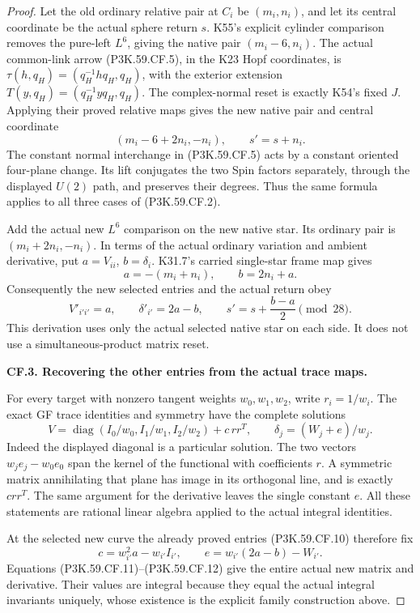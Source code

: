 \begin{proof}
Let the old ordinary relative pair at \(C_i\) be \((m_i,n_i)\),
and let its central coordinate be the actual sphere return \(s\).
K55's explicit cylinder comparison removes the pure-left
\(L^6\), giving the native pair \((m_i-6,n_i)\).
The actual common-link arrow (P3K.59.CF.5), in the K23 Hopf coordinates,
is \(\tau(h,q_H)=(q_H^{-1}hq_H,q_H)\), with the exterior
extension \(T(y,q_H)=(q_H^{-1}yq_H,q_H)\). The complex-normal
reset is exactly K54's fixed \(J\). Applying their proved
relative maps gives the new native pair and central coordinate
\[
 (m_i-6+2n_i,-n_i),\qquad s'=s+n_i.                   \tag{P3K.59.CF.9}
\]
The constant normal interchange in (P3K.59.CF.5) acts by a constant
oriented four-plane change. Its lift conjugates the two Spin
factors separately, through the displayed \(U(2)\) path, and
preserves their degrees. Thus the same formula applies to
all three cases of (P3K.59.CF.2).

Add the actual new \(L^6\) comparison on the new native star.
Its ordinary pair is \((m_i+2n_i,-n_i)\). In terms of the
actual ordinary variation and ambient derivative, put
\(a=V_{ii}\), \(b=\delta_i\). K31.7's carried single-star
frame map gives
\[
 a=-(m_i+n_i),\qquad b=2n_i+a.
\]
Consequently the new selected entries and the actual return obey
\[
 V'_{i'i'}=a,\qquad \delta'_{i'}=2a-b,\qquad
 s'=s+\frac{b-a}{2}\pmod {28}.                       \tag{P3K.59.CF.10}
\]
This derivation uses only the actual selected native star on
each side. It does not use a simultaneous-product matrix reset.

\par\medskip\noindent\textbf{CF.3. Recovering the other entries from the actual trace maps.}\par\nopagebreak[4]

For every target with nonzero tangent weights \(w_0,w_1,w_2\),
write \(r_i=1/w_i\). The exact GF trace identities and symmetry
have the complete solutions
\[
 V=\operatorname{diag}(I_0/w_0,I_1/w_1,I_2/w_2)+c\,rr^T,
 \qquad \delta_j=(W_j+e)/w_j.                         \tag{P3K.59.CF.11}
\]
Indeed the displayed diagonal is a particular solution. The
two vectors \(w_je_j-w_0e_0\) span the kernel of the functional
with coefficients \(r\). A symmetric matrix annihilating that
plane has image in its orthogonal line, and is exactly
\(c rr^T\). The same argument for the derivative leaves
the single constant \(e\). All these statements are rational
linear algebra applied to the actual integral identities.

At the selected new curve the already proved entries (P3K.59.CF.10)
therefore fix
\[
 c=w_{i'}^2a-w_{i'}I_{i'},\qquad
 e=w_{i'}(2a-b)-W_{i'}.                               \tag{P3K.59.CF.12}
\]
Equations (P3K.59.CF.11)--\allowbreak (P3K.59.CF.12) give the entire actual new matrix
and derivative. Their values are integral because they equal
the actual integral invariants uniquely, whose existence is
the explicit family construction above.


\end{proof}
